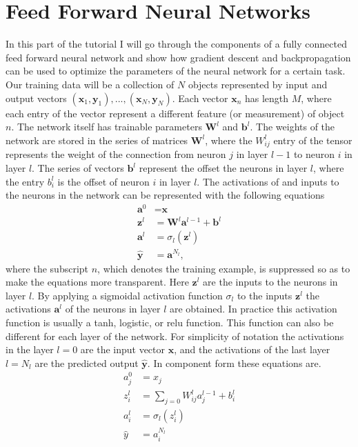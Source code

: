 \documentclass{article}
\begin{document}
\section*{Feed Forward Neural Networks}
In this part of the tutorial I will go through the components of a fully connected feed forward neural network and show how gradient descent and backpropagation can be used to optimize the parameters of the neural network for a certain task. Our training data will be a collection of $N$ objects represented by input and output vectors $(\textbf{x}_1, \textbf{y}_1),...,(\textbf{x}_N, \textbf{y}_N)$. Each vector $\textbf{x}_n$ has length $M$, where each entry of the vector represent a different feature (or measurement) of object $n$. The network itself has trainable parameters $\textbf{W}^l$ and $\textbf{b}^l$. The weights of the network are stored in the series of matrices $\textbf{W}^l$, where the $W_{ij}^l$ entry of the tensor represents the weight of the connection from neuron $j$ in layer $l-1$ to neuron $i$ in layer $l$. The series of vectors $\textbf{b}^l$ represent the offset the neurons in layer $l$, where the entry $b_{i}^l$ is the offset of neuron $i$ in layer $l$. The activations of and inputs to the neurons in the network can be represented with the following equations
\begin{equation}	
\begin{split}
\textbf{a}^0 &= \textbf{x} \\
\textbf{z}^{l} &= \textbf{W}^l \textbf{a}^{l-1} + \textbf{b}^{l} \\
\textbf{a}^{l} &= \sigma_l (\textbf{z}^{l}) \\
\hat{\textbf{y}} &= \textbf{a}^{N_l},
\end{split}
\end{equation}
where the subscript $n$, which denotes the training example, is suppressed so as to make the equations more transparent. Here $\textbf{z}^l$ are the inputs to the neurons in layer $l$. By applying a sigmoidal activation function $\sigma_l$ to the inputs $\textbf{z}^l$ the activations $\textbf{a}^l$ of the neurons in layer $l$ are obtained. In practice this activation function is usually a tanh, logistic, or relu function. This function can also be different for each layer of the network. For simplicity of notation the activations in the layer $l=0$ are the input vector $\textbf{x}$, and the activations of the last layer $l=N_l$ are the predicted output $\hat{\textbf{y}}$. In component form these equations are.
\begin{equation}
\label{eq:nn_components}
\begin{split}
a_j^0 &= x_j \\
z_i^{l} &= \sum_{j=0} W_{ij}^l a_j^{l-1} + b_i^{l} \\
a_i^{l} &= \sigma_l (z_i^{l}) \\
\hat{y} &= a_i^{N_l}
\end{split}
\end{equation}
\end{document}
